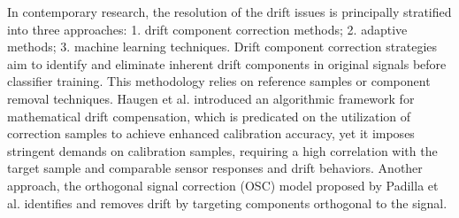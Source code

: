 \documentclass[a4paper]{cas-sc}
\begin{document}
In contemporary research, the resolution of the drift issues is principally stratified into three approaches: 1. drift component correction methods; 2. adaptive methods; 3. machine learning techniques. 
Drift component correction strategies aim to identify and eliminate inherent drift components in original signals before classifier training. This methodology relies on reference samples or component removal techniques. 
Haugen et al. \cite{haugen2000calibration} introduced an algorithmic framework for mathematical drift compensation, which is predicated on the utilization of correction samples to achieve enhanced calibration accuracy, yet it imposes stringent demands on calibration samples, requiring a high correlation with the target sample and comparable sensor responses and drift behaviors. Another approach, the orthogonal signal correction (OSC) model proposed by Padilla et al.\citep{padilla2010drift} identifies and removes drift by targeting components orthogonal to the signal.

\end{document}
